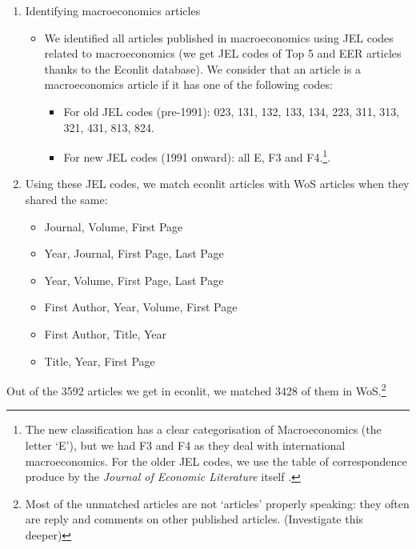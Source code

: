 \documentclass[]{elsarticle} %
\providecommand{\tightlist}{%
  \setlength{\itemsep}{0pt}\setlength{\parskip}{0pt}}
\begin{document}
\begin{enumerate}
\def\labelenumi{\arabic{enumi}.}
\item
  Identifying macroeconomics articles

  \begin{itemize}
  \item
    We identified all articles published in macroeconomics using JEL
    codes related to macroeconomics (we get JEL codes of Top 5 and EER
    articles thanks to the Econlit database). We consider that an
    article is a macroeconomics article if it has one of the following
    codes:

    \begin{itemize}
    \tightlist
    \item
      For old JEL codes (pre-1991): 023, 131, 132, 133, 134, 223, 311,
      313, 321, 431, 813, 824.
    \item
      For new JEL codes (1991 onward): all E, F3 and F4.\footnote{The
        new classification has a clear categorisation of Macroeconomics
        (the letter `E'), but we had F3 and F4 as they deal with
        international macroeconomics. For the older JEL codes, we use
        the table of correspondence produce by the \emph{Journal of
        Economic Literature} itself \citep{jel1991}.}.
    \end{itemize}
  \end{itemize}
\item
  Using these JEL codes, we match econlit articles with WoS articles
  when they shared the same:

  \begin{itemize}
  \tightlist
  \item
    Journal, Volume, First Page
  \item
    Year, Journal, First Page, Last Page
  \item
    Year, Volume, First Page, Last Page
  \item
    First Author, Year, Volume, First Page
  \item
    First Author, Title, Year
  \item
    Title, Year, First Page
  \end{itemize}
\end{enumerate}

Out of the 3592 articles we get in econlit, we matched 3428 of them in
WoS.\footnote{Most of the unmatched articles are not `articles' properly
  speaking: they often are reply and comments on other published
  articles. (Investigate this deeper)}
\end{document}
